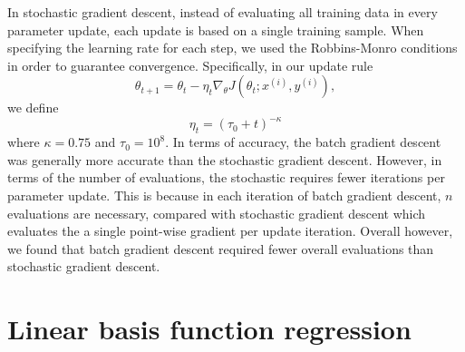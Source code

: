 \documentclass{article}
\begin{document}
In stochastic gradient descent, instead of evaluating all training data in every parameter update, each update is based on a single training sample. When specifying the learning rate for each step, we used the Robbins-Monro conditions in order to guarantee convergence. Specifically, in our update rule
$$\theta_{t+1} = \theta_{t} - \eta_{t}\nabla_{\theta}J(\theta_t; x^{(i)}, y^{(i)}),$$
we define
$$\eta_t = (\tau_0 + t)^{-\kappa}$$
where $\kappa = 0.75$ and $\tau_{0} = 10^{8}$. In terms of accuracy, the batch gradient descent was generally more accurate than the stochastic gradient descent. However, in terms of the number of evaluations, the stochastic requires fewer iterations per parameter update. This is because in each iteration of batch gradient descent, $n$ evaluations are necessary, compared with stochastic gradient descent which evaluates the a single point-wise gradient per update iteration. Overall however, we found that batch gradient descent required fewer overall evaluations than stochastic gradient descent.

\section{Linear basis function regression}
\end{document}
